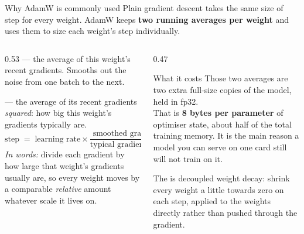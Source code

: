 \documentclass[aspectratio=169,10pt]{beamer}
\begin{document}
\begin{frame}[shrink=12]{Why AdamW is commonly used}
  Plain gradient descent takes the same size of step for every weight. AdamW
  keeps \textbf{two running averages per weight} and uses them to size each
  weight's step individually.
  \vspace{0.4em}
  \begin{columns}[T]
    \begin{column}{0.53\textwidth}
       --- the average of this weight's recent gradients. Smooths
      out the noise from one batch to the next.
      \vspace{0.4em}

       --- the average of its recent gradients
      \emph{squared}: how big this weight's gradients typically are.
      \[
        \text{step} \;=\; \text{learning rate} \times
          \frac{\text{smoothed gradient}}{\text{typical gradient size}}
      \]
      \emph{In words:} divide each gradient by how large that weight's gradients
      usually are, so every weight moves by a comparable \emph{relative} amount
      whatever scale it lives on.
    \end{column}
    \begin{column}{0.47\textwidth}
      \begin{block}{What it costs}
        \small
        Those two averages are two extra full-size copies of the model, held in
        fp32.\\[0.4em]
        That is \textbf{8 bytes per parameter} of optimiser state, about half
        of the total training memory. It is the main reason a model you can
        serve on one card still will not train on it.
      \end{block}
      \vspace{0.3em}
      \small
      The  is decoupled weight decay: shrink every weight a little
      towards zero on each step, applied to the weights directly rather than
      pushed through the gradient.
    \end{column}
  \end{columns}
\end{frame}
\end{document}
